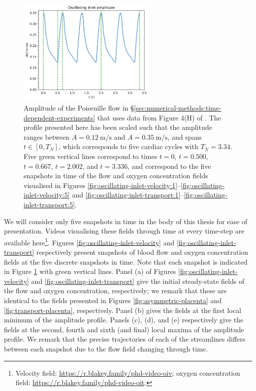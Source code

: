         \begin{figure}
            \centering
            \includegraphics[width=0.6\textwidth]{diagrams/results-modelling/velocity-transport-oscillating/amplitude.png}
            \caption{Amplitude of the Poiseuille flow in \S\ref{sec:numerical-methods:time-dependent-experiments} that uses data from Figure 4(H) of \cite{carsonPersonalisingCardiovascularNetwork2021}. The profile presented here has been scaled such that the amplitude ranges between $A = \qty{0.12}{\metre\per\second}$ and $A = \qty{0.35}{\metre\per\second}$, and spans $t \in [0, T_N]$, which corresponds to five cardiac cycles with $T_N = 3.34$. Five green vertical lines correspond to times $t=0$, $t=0.500$, $t=0.667$, $t=2.002$, and $t=3.336$, and correspond to the five snapshots in time of the flow and oxygen concentration fields visualised in Figures \ref{fig:oscillating-inlet-velocity:1}--\ref{fig:oscillating-inlet-velocity:5} and \ref{fig:oscillating-inlet-transport:1}--\ref{fig:oscillating-inlet-transport:5}.}
            \label{fig:oscillating-inlet-amplitude}
        \end{figure}

        We will consider only five snapshots in time in the body of this thesis for ease of presentation. Videos visualising these fields through time at every time-step are available here\footnote{Velocity field: \url{https://r.blakey.family/phd-video-oiv}; oxygen concentration field: \url{https://r.blakey.family/phd-video-oit}.}. Figures \ref{fig:oscillating-inlet-velocity} and \ref{fig:oscillating-inlet-transport} respectively present snapshots of blood flow and oxygen concentration fields at the five discrete snapshots in time. Note that each snapshot is indicated in Figure \ref{fig:oscillating-inlet-amplitude} with green vertical lines. Panel (a) of Figures \ref{fig:oscillating-inlet-velocity} and \ref{fig:oscillating-inlet-transport} give the initial steady-state fields of the flow and oxygen concentration, respectively; we remark that these are identical to the fields presented in Figures \ref{fig:asymmetric-placenta} and \ref{fig:transport-placenta}, respectively. Panel (b) gives the fields at the first local minimum of the amplitude profile. Panels (c), (d), and (e) respectively give the fields at the second, fourth and sixth (and final) local maxima of the amplitude profile. We remark that the precise trajectories of each of the streamlines differs between each snapshot due to the flow field changing through time.

